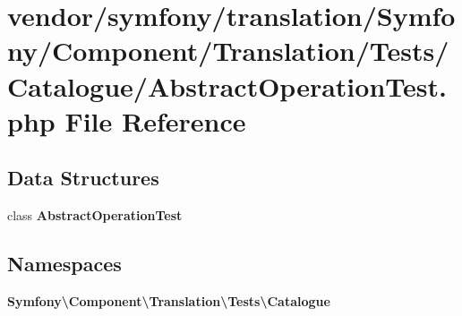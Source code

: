 \section{vendor/symfony/translation/\+Symfony/\+Component/\+Translation/\+Tests/\+Catalogue/\+Abstract\+Operation\+Test.php File Reference}
\label{_abstract_operation_test_8php}
\subsection*{Data Structures}
\begin{DoxyCompactItemize}
\item 
class {\bf Abstract\+Operation\+Test}
\end{DoxyCompactItemize}
\subsection*{Namespaces}
\begin{DoxyCompactItemize}
\item 
 {\bf Symfony\textbackslash{}\+Component\textbackslash{}\+Translation\textbackslash{}\+Tests\textbackslash{}\+Catalogue}
\end{DoxyCompactItemize}
